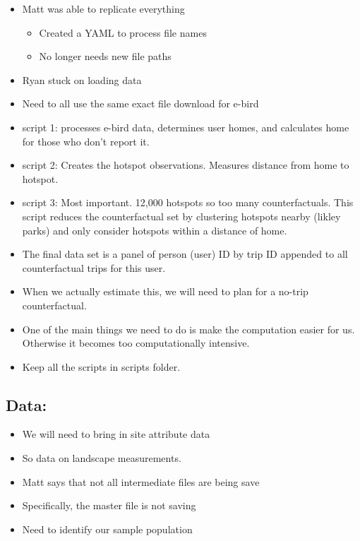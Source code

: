 \documentclass[
  letterpaper,
]{article}
\providecommand{\tightlist}{%
  \setlength{\itemsep}{0pt}\setlength{\parskip}{0pt}}\usepackage{longtable,booktabs,array}
\begin{document}
\begin{tcolorbox}
\begin{itemize}
\tightlist
\item
  Matt was able to replicate everything

  \begin{itemize}
  \tightlist
  \item
    Created a YAML to process file names
  \item
    No longer needs new file paths
  \end{itemize}
\item
  Ryan stuck on loading data
\item
  Need to all use the same exact file download for e-bird
\item
  script 1: processes e-bird data, determines user homes, and calculates
  home for those who don't report it.
\item
  script 2: Creates the hotspot observations. Measures distance from
  home to hotspot.
\item
  script 3: Most important. 12,000 hotspots so too many counterfactuals.
  This script reduces the counterfactual set by clustering hotspots
  nearby (likley parks) and only consider hotspots within a distance of
  home.
\item
  The final data set is a panel of person (user) ID by trip ID appended
  to all counterfactual trips for this user.
\item
  When we actually estimate this, we will need to plan for a no-trip
  counterfactual.
\item
  One of the main things we need to do is make the computation easier
  for us. Otherwise it becomes too computationally intensive.
\item
  Keep all the scripts in scripts folder.
\end{itemize}

\subsection{Data:}\label{data}

\begin{itemize}
\tightlist
\item
  We will need to bring in site attribute data
\item
  So data on landscape measurements.
\item
  Matt says that not all intermediate files are being save
\item
  Specifically, the master file is not saving
\item
  Need to identify our sample population


\end{itemize}
\end{tcolorbox}
\end{document}
